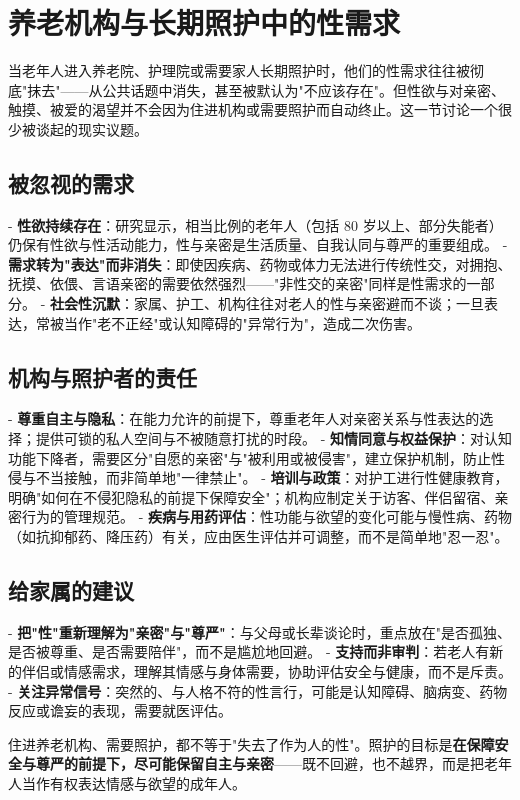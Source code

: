 \section{养老机构与长期照护中的性需求}

当老年人进入养老院、护理院或需要家人长期照护时，他们的性需求往往被彻底"抹去"——从公共话题中消失，甚至被默认为"不应该存在"。但性欲与对亲密、触摸、被爱的渴望并不会因为住进机构或需要照护而自动终止。这一节讨论一个很少被谈起的现实议题。

\subsection{被忽视的需求}

- \textbf{性欲持续存在}：研究显示，相当比例的老年人（包括 80 岁以上、部分失能者）仍保有性欲与性活动能力，性与亲密是生活质量、自我认同与尊严的重要组成。
- \textbf{需求转为"表达"而非消失}：即使因疾病、药物或体力无法进行传统性交，对拥抱、抚摸、依偎、言语亲密的需要依然强烈——"非性交的亲密"同样是性需求的一部分。
- \textbf{社会性沉默}：家属、护工、机构往往对老人的性与亲密避而不谈；一旦表达，常被当作"老不正经"或认知障碍的"异常行为"，造成二次伤害。

\subsection{机构与照护者的责任}

- \textbf{尊重自主与隐私}：在能力允许的前提下，尊重老年人对亲密关系与性表达的选择；提供可锁的私人空间与不被随意打扰的时段。
- \textbf{知情同意与权益保护}：对认知功能下降者，需要区分"自愿的亲密"与"被利用或被侵害"，建立保护机制，防止性侵与不当接触，而非简单地"一律禁止"。
- \textbf{培训与政策}：对护工进行性健康教育，明确"如何在不侵犯隐私的前提下保障安全"；机构应制定关于访客、伴侣留宿、亲密行为的管理规范。
- \textbf{疾病与用药评估}：性功能与欲望的变化可能与慢性病、药物（如抗抑郁药、降压药）有关，应由医生评估并可调整，而不是简单地"忍一忍"。

\subsection{给家属的建议}

- \textbf{把"性"重新理解为"亲密"与"尊严"}：与父母或长辈谈论时，重点放在"是否孤独、是否被尊重、是否需要陪伴"，而不是尴尬地回避。
- \textbf{支持而非审判}：若老人有新的伴侣或情感需求，理解其情感与身体需要，协助评估安全与健康，而不是斥责。
- \textbf{关注异常信号}：突然的、与人格不符的性言行，可能是认知障碍、脑病变、药物反应或谵妄的表现，需要就医评估。

\begin{tcolorbox}[colback=pink!5!white,colframe=red!50!black,title=核心原则]
住进养老机构、需要照护，都不等于"失去了作为人的性"。照护的目标是\textbf{在保障安全与尊严的前提下，尽可能保留自主与亲密}——既不回避，也不越界，而是把老年人当作有权表达情感与欲望的成年人。
\end{tcolorbox}
